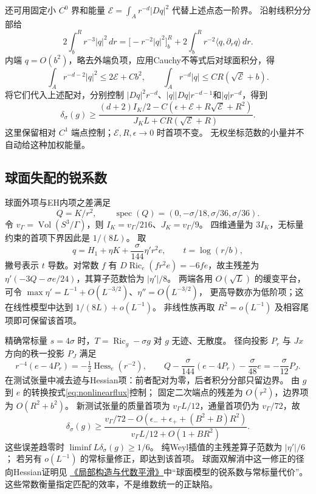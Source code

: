 \documentclass[UTF8,a4paper,11pt,fontset=fandol]{ctexart}
\numberwithin{equation}{section}
\theoremstyle{definition}
\newcommand{\Ric}{\operatorname{Ric}}
\newcommand{\Vol}{\operatorname{Vol}}
\begin{document}
还可用固定小 $C^0$ 界和能量
$\mathcal E=\int_A r^{-d}|Dq|^2$ 代替上述点态一阶界。
沿射线积分分部给
\[
2\int_b^Rr^{-3}|q|^2\,dr
=\bigl[-r^{-2}|q|^2\bigr]_b^R+
2\int_b^Rr^{-2}\langle q,\partial_rq\rangle\,dr.
\]
内端 $q=O(b^2)$，略去外端负项，应用Cauchy不等式后对球面积分，得
\[
\int_A r^{-d-2}|q|^2\le2\mathcal E+Cb^2,\qquad
\int_A r^{-d}|q|\le CR(\sqrt{\mathcal E}+b).
\]
将它们代入上述配对，分别控制
$|Dq|^2r^{-d}$、$|q||Dq|r^{-d-1}$和$|q|r^{-d}$，得到
\begin{equation}\label{eq:energyflux}
\delta_\sigma(g)\ge
\frac{(d+2)I_K/2-C(\epsilon+\mathcal E+R\sqrt{\mathcal E}+R^2)}
{J_KL+CR(\sqrt{\mathcal E}+R)}.
\end{equation}
这里保留相对 $C^1$ 端点控制；$\mathcal E,R,\epsilon\to0$ 时首项不变。
无权坐标范数的小量并不自动给这种加权能量。

\subsection{球面失配的锐系数}
球面外项与EH内项之差满足
\[
Q=K/r^2,\qquad \operatorname{spec}(Q)=(0,-\sigma/18,\sigma/36,\sigma/36).
\]
令 $v_\Gamma=\Vol(S^3/\Gamma)$，则
$I_K=v_\Gamma/216$、$J_K=v_\Gamma/9$。
四维通量为 $3I_K$，无标量约束的首项下界因此是 $1/(8L)$。
取
\[
q=H_1+\eta K+\frac{\sigma}{144}\eta' r^2e,\qquad t=\log(r/b),
\]
撇号表示 $t$ 导数。对常数 $f$ 有
$D\Ric_e(fr^2e)=-6f e$，故主残差为
$\eta'(-3Q-\sigma e/24)$，其算子范数恰为 $|\eta'|/8$。
两端各用 $O(\sqrt L)$ 的缓变平台，可令
$\max\eta'=L^{-1}+O(L^{-3/2})$、$\eta''=O(L^{-3/2})$，
更高导数亦为低阶项；这在线性模型中达到 $1/(8L)+o(L^{-1})$。
非线性族再取 $R^2=o(L^{-1})$ 及相容尾项即可保留该首项。

精确常标量 $s=4\sigma$ 时，$T=\Ric_g-\sigma g$ 对 $g$ 无迹、无散度。
径向投影 $P_r$ 与 $Jx$ 方向的秩一投影 $P_J$ 满足
\[
r^{-4}(e-4P_r)=-\tfrac12\operatorname{Hess}_e(r^{-2}),\qquad
Q-\frac{\sigma}{144}(e-4P_r)-\frac{\sigma}{48}e=-\frac{\sigma}{12}P_J.
\]
在测试张量中减去迹与Hessian项：前者配对为零，后者积分分部只留边界。
由 $g$ 到 $e$ 的转换按式\eqref{eq:nonlinearflux}控制；
固定二次端点的残差为 $O(r^2)$，边界项为 $O(R^2+b^2)$。
新测试张量的质量首项为 $v_\Gamma L/12$，通量首项仍为 $v_\Gamma/72$，故
\[
\delta_\sigma(g)\ge
\frac{v_\Gamma/72-O(\epsilon_-+\epsilon_++(B^2+B)R^2)}
{v_\Gamma L/12+O(1+BR^2)}.
\]
这些误差趋零时 $\liminf L\delta_\sigma(g)\ge1/6$。
纯Weyl插值的主残差算子范数为 $|\eta'|/6$；
若另有 $o(L^{-1})$ 的常标量修正，即达到该首项。
球面双解消中这一修正的径向Hessian证明见
\href{20260912.tex}{《局部构造与代数平滑》}中“球面模型的锐系数与常标量代价”。
这些常数衡量指定匹配的效率，不是维数统一的正缺陷。
\end{document}
